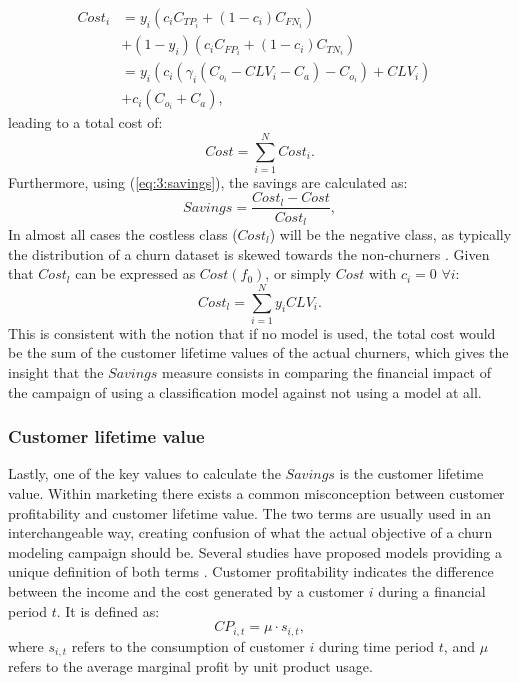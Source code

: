 \begin{align}
  Cost_i &= y_i(c_i C_{TP_i} + (1-c_i)C_{FN_i})& \nonumber \\
         &  + (1-y_i)(c_i C_{FP_i} + (1-c_i)C_{TN_i})& \nonumber \\
         &= y_i(c_i\left(\gamma_i(C_{o_i}-CLV_i-C_a)-C_{o_i}\right)+CLV_i)&\nonumber \\
         & +c_i(C_{o_i}+C_a),&
	\end{align}
leading to a total cost of:
\begin{equation}
    Cost = \sum_{i=1}^N Cost_i.
\end{equation}
Furthermore, using (\ref{eq:3:savings}), the savings are calculated as:
\begin{equation}
  Savings = \frac{Cost_l - Cost}{Cost_l},
\end{equation} 
In almost all cases the costless class ($Cost_l$) will be the negative class, as typically the 
distribution of a churn dataset is skewed towards the non-churners \citep{Verbeke2012}. Given that 
$Cost_l$ can be expressed as $Cost(f_0)$, or simply $Cost$ with $c_i=0$ $\forall i$:
\begin{equation}
 Cost_l = \sum_{i=1}^{N} y_i CLV_i.
\end{equation}
This is consistent with the notion that if no model is used, the total cost would be the 
sum of the customer lifetime values of the actual churners, which gives the insight 
that the $Savings$ measure consists in comparing the financial impact of the campaign of using a 
classification model against not using a model at all.


\subsubsection{Customer lifetime value}

Lastly, one of the key values to calculate the $Savings$ is the customer lifetime value. Within 
marketing there exists a common misconception between customer profitability and customer lifetime 
value. The two terms are usually used in an interchangeable way, 
creating confusion of what the actual objective of a churn modeling campaign should be. Several 
studies have proposed models providing a unique definition of both terms 
\citep{Neslin2006,Pfeifer2004,Milne1999a,VanRaaij2003}. Customer 
profitability indicates the difference between the income and the cost 
generated by a customer $i$ during a financial period $t$. It is defined as: 
\begin{equation}
	CP_{i,t} = \mu  \cdot s_{i,t},
\end{equation}
where  $s_{i,t}$ refers to the consumption of customer $i$ during time period $t$, and $\mu$ refers 
to the average marginal profit by unit product usage.  

